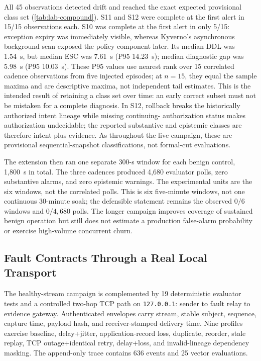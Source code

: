 \begin{table}[t]
\centering
\caption{Secondary Compound-Scenario Extension Across Five Injections and
Three Cadences per Scenario. Injections and correlated cadence observations
are shown separately. DR Counts First-Alert Detection and Exact Counts First
Exact Class-Set Completion; ``First Complete'' Is the Fraction Whose First
Alert Already Contained That Set.
DDL, ESC, and DG Are Seconds.}
\label{tab:lab-compound}
\footnotesize

\end{table}

All 45 observations detected drift and reached the exact expected provisional
class set (\cref{tab:lab-compound}). S11 and S12 were complete at the first
alert in 15/15 observations each. S10 was complete at the first alert in only
5/15: exception expiry was immediately visible, whereas Kyverno's asynchronous
background scan exposed the policy component later. Its median DDL was
1.54~s, but median ESC was 7.61~s (P95 14.23~s); median diagnostic gap was
5.98~s (P95 10.03~s). These P95 values use nearest rank over 15 correlated
cadence observations from five injected episodes; at $n=15$, they equal the
sample maxima and are descriptive maxima, not independent tail estimates.
This is the intended result of retaining a class set over time: an early
correct subset must not be mistaken for a complete diagnosis. In S12, rollback
breaks the historically authorized intent lineage while missing continuing-
authorization status makes authorization undecidable; the reported substantive
and epistemic classes are therefore intent plus evidence. As throughout the
live campaign, these are provisional sequential-snapshot classifications, not
formal-cut evaluations.

The extension then ran one separate 300-s window for each benign control, 1,800~s in
total. The three cadences produced 4,680 evaluator polls, zero substantive
alarms, and zero epistemic warnings. The experimental units are the six
windows, not the correlated polls. This is six five-minute windows, not one
continuous 30-minute soak; the defensible statement remains the
observed $0/6$ windows and $0/4{,}680$ polls. The longer campaign improves
coverage of sustained benign operation but still does not estimate a
production false-alarm probability or exercise high-volume concurrent churn.

\subsection{Fault Contracts Through a Real Local Transport}
The healthy-stream campaign is complemented by 19 deterministic evaluator
tests and a controlled two-hop TCP path on \texttt{127.0.0.1}: sender to fault
relay to evidence gateway. Authenticated envelopes carry stream, stable
subject, sequence, capture time, payload hash, and receiver-stamped delivery
time. Nine profiles exercise baseline, delay+jitter, application-record loss,
duplicate, reorder, stale replay, TCP outage+identical retry, delay+loss, and
invalid-lineage dependency masking. The append-only trace contains 636 events
and 25 vector evaluations.

